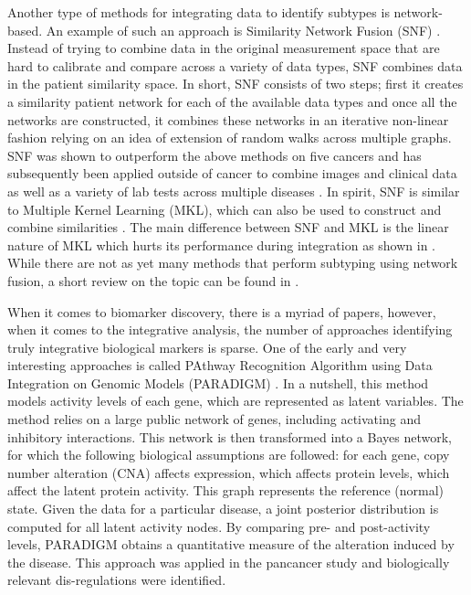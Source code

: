 \documentclass[5p]{elsarticle}
\newcommand{\rev}[1]{{\color{black}#1}}
\begin{document}
Another type of methods for integrating data to identify subtypes is network-based. An example of such an approach is Similarity Network Fusion (SNF) \cite{Wang2014similarity}. Instead of trying to combine data in the original measurement space that are hard to calibrate and compare across a variety of data types, SNF combines data in the patient similarity space. In short, SNF consists of two \rev{steps;} first it creates a similarity patient network for each of the available data types and once all the networks are constructed, it combines these networks in an iterative non-linear fashion relying on an idea of extension of random walks across multiple graphs. SNF was shown to outperform the \rev{above methods} \cite{Wang2014similarity} on five cancers and has subsequently been applied outside of cancer to combine images and clinical data as well as a variety of lab tests across multiple diseases \cite{Cavalli:2017,Vega:2018,Zizzo:2018,Stefanik:2017,TCGA:2017}. \rev{In spirit, SNF is similar to Multiple} Kernel Learning (MKL), which can also be used to construct and combine similarities \cite{Huang:2012}. The main difference between SNF and MKL is the linear nature of MKL which hurts its performance during integration as shown in \cite{Wang2014similarity}. While there are not as yet many methods that perform subtyping using network fusion, a short review on the topic can be found in \cite{Pai:2018}.

When it comes to biomarker discovery, there is a myriad of papers, however, when it comes to the integrative analysis, the number of approaches identifying truly integrative biological markers is sparse. One of the early and very interesting approaches is called PAthway Recognition Algorithm using Data Integration on Genomic Models (PARADIGM) \cite{Vaske:2010}. In a nutshell, this method models activity levels of each gene, which are represented as latent variables. The method relies on a large public network of genes, including activating and inhibitory interactions. This network is then transformed into a Bayes \rev{network,} for which the following biological assumptions are followed: for each gene, \rev{copy number alteration (CNA)} affects expression, which affects protein levels, which affect the latent protein activity. This graph represents the reference (normal) state. Given the data for a particular disease, a joint posterior distribution is computed for all latent activity nodes. By comparing pre- and post-activity levels, PARADIGM obtains a quantitative measure of the alteration induced by the disease. This approach was applied in the pancancer study \cite{Hoadley:2014} and biologically relevant dis-regulations were identified.
\end{document}
